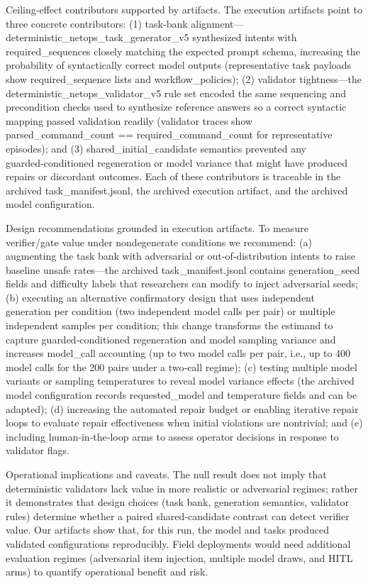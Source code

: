 \documentclass[conference]{IEEEtran}
\begin{document}
Ceiling‑effect contributors supported by artifacts. The execution artifacts point to three concrete contributors: (1) task‑bank alignment---deterministic\_netops\_task\_generator\_v5 synthesized intents with required\_sequences closely matching the expected prompt schema, increasing the probability of syntactically correct model outputs (representative task payloads show required\_sequence lists and workflow\_policies); (2) validator tightness---the deterministic\_netops\_validator\_v5 rule set encoded the same sequencing and precondition checks used to synthesize reference answers so a correct syntactic mapping passed validation readily (validator traces show parsed\_command\_count == required\_command\_count for representative episodes); and (3) shared\_initial\_candidate semantics prevented any guarded‑conditioned regeneration or model variance that might have produced repairs or discordant outcomes. Each of these contributors is traceable in the archived task\_manifest.jsonl, the archived execution artifact, and the archived model configuration.

Design recommendations grounded in execution artifacts. To measure verifier/gate value under nondegenerate conditions we recommend: (a) augmenting the task bank with adversarial or out‑of‑distribution intents to raise baseline unsafe rates---the archived task\_manifest.jsonl contains generation\_seed fields and difficulty labels that researchers can modify to inject adversarial seeds; (b) executing an alternative confirmatory design that uses independent generation per condition (two independent model calls per pair) or multiple independent samples per condition; this change transforms the estimand to capture guarded‑conditioned regeneration and model sampling variance and increases model\_call accounting (up to two model calls per pair, i.e., up to 400 model calls for the 200 pairs under a two‑call regime); (c) testing multiple model variants or sampling temperatures to reveal model variance effects (the archived model configuration records requested\_model and temperature fields and can be adapted); (d) increasing the automated repair budget or enabling iterative repair loops to evaluate repair effectiveness when initial violations are nontrivial; and (e) including human‑in‑the‑loop arms to assess operator decisions in response to validator flags.

Operational implications and caveats. The null result does not imply that deterministic validators lack value in more realistic or adversarial regimes; rather it demonstrates that design choices (task bank, generation semantics, validator rules) determine whether a paired shared‑candidate contrast can detect verifier value. Our artifacts show that, for this run, the model and tasks produced validated configurations reproducibly. Field deployments would need additional evaluation regimes (adversarial item injection, multiple model draws, and HITL arms) to quantify operational benefit and risk.
\end{document}
